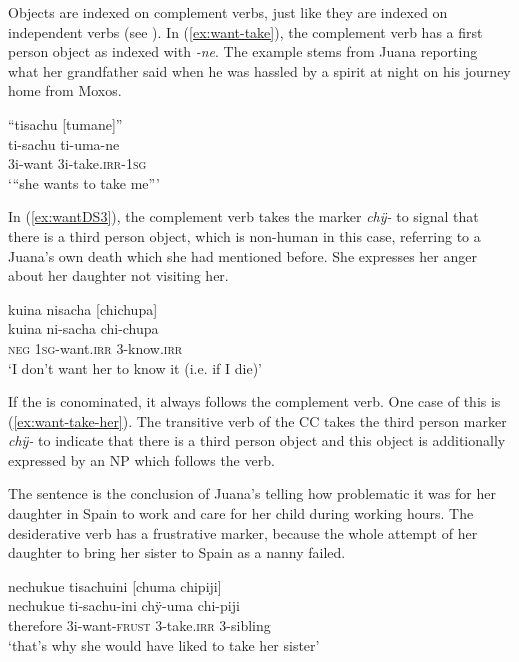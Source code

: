 Objects are indexed on complement verbs, just like they are indexed on independent verbs (see ). In (\ref{ex:want-take}), the complement verb has a first person object as indexed with \textit{-ne}. The example stems from Juana reporting what her grandfather said when he was hassled by a spirit at night on his journey home from Moxos.

\ea\label{ex:want-take}
\begingl
\glpreamble “tisachu \textup{[}tumane\textup{]}”\\
\gla ti-sachu ti-uma-ne\\
\glb3i-want 3i-take.\textsc{irr}-1\textsc{sg} \\
\glft ‘“she wants to take me”’
\endgl
\trailingcitation{[jxx-p151016l-2.217]}
\xe


In (\ref{ex:wantDS3}), the complement verb takes the marker \textit{chÿ-} to signal that there is a third person object, which is non-human in this case, referring to a Juana’s own death which she had mentioned before. She expresses her anger about her daughter not visiting her.

\ea\label{ex:wantDS3}
\begingl
\glpreamble kuina nisacha \textup{[}chichupa\textup{]}\\
\gla kuina ni-sacha chi-chupa\\
\glb \textsc{neg} 1\textsc{sg}-want.\textsc{irr} 3-know.\textsc{irr}\\
\glft ‘I don’t want her to know it (i.e. if I die)’
\endgl
\trailingcitation{[jxx-p120430l-1.319]}
\xe

If the  is conominated, it always follows the complement verb. One case of this is (\ref{ex:want-take-her}). The transitive verb of the CC takes the third person marker \textit{chÿ-} to indicate that there is a third person object and this object is additionally expressed by an NP which follows the verb.

The sentence is the conclusion of Juana’s telling how problematic it was for her daughter in Spain to work and care for her child during working hours. The desiderative verb has a frustrative marker, because the whole attempt of her daughter to bring her sister to Spain as a nanny failed.

\ea\label{ex:want-take-her}
\begingl
\glpreamble nechukue tisachuini \textup{[}chuma chipiji\textup{]}\\
\gla nechukue ti-sachu-ini chÿ-uma chi-piji\\
\glb therefore 3i-want-\textsc{frust} 3-take.\textsc{irr} 3-sibling\\
\glft ‘that’s why she would have liked to take her sister’
\endgl
\trailingcitation{[jxx-p110923l-1.374]}
\xe

